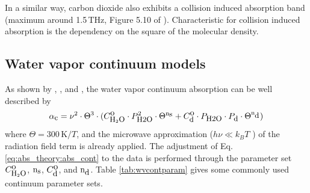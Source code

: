 In a similar way, carbon dioxide also exhibits a collision induced
absorption band (maximum around 1.5\,THz, Figure 5.10 of
\citet{goodyandyung:89}). Characteristic for collision induced
absorption is the dependency on the square of the molecular density.



\subsection{Water vapor continuum models}
\label{leveld:h2o_Cont}
As shown by \citet{liebeandlayton:87}, \citet{pwr:98}, and \citet{ma:90},
the water vapor continuum absorption can be well described by 
\begin{equation} 
  \label{eq:abs_theory:abs_cont}
  \alphac = \nu^2 \cdot \Theta^{3} \cdot 
            (\cso \cdot \phzo^2 \cdot \Theta^{\xs} + 
             \cdo \cdot \phzo \cdot \pda \cdot \Theta^{\xd})  %
\end{equation}
where $\Theta=300\,\mbox{K}/T$, and the microwave approximation ($h\nu\ll k_BT$ ) of the radiation field term
is already applied. The adjustment of Eq. \ref{eq:abs_theory:abs_cont} to the data 
is performed through the parameter set $C^{\mbox{\rm o}}_{\mbox{\rm \small H}_{2}\mbox{\rm \small O}}$, ${\rm n}_{\mbox{\rm \small s}}$, $C^{\mbox{\rm o}}_{\mbox{\rm \small d}}$, and ${\rm n}_{\mbox{\rm \small d}}$. 
Table \ref{tab:wvcontparam} gives some commonly used continuum parameter sets.
